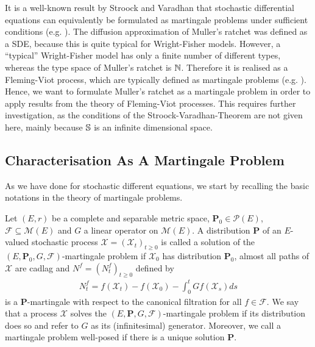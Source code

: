 \noindent
It is a well-known result by Stroock and Varadhan that stochastic differential equations can
equivalently be formulated as martingale problems under sufficient conditions (e.g.
\cite[Theorem 18.7]{kallenberg_foundations_1997}). The diffusion approximation of Muller's ratchet
was defined as a SDE, because this is quite typical for Wright-Fisher models.
However, a ``typical'' Wright-Fisher model has only a finite number of different
types, whereas the type space of Muller's ratchet is $\mathbb{N}$. Therefore it is realised as
a Fleming-Viot process, which are typically defined as martingale problems (e.g.
\cite{ethier_flemingviot_1993}). Hence, we want to formulate Muller's ratchet as
a martingale problem in order to apply results from the theory of Fleming-Viot
processes. This requires further investigation, as the conditions of the
Stroock-Varadhan-Theorem are not given here, mainly because $\mathbb{S}$ is an
infinite dimensional space.


\subsection{Characterisation As A Martingale Problem}

As we have done for stochastic different equations, we start by recalling the basic notations in the
theory of martingale problems.

\begin{Definition}
Let $(E,r)$ be a complete and separable metric space, $\mathbf{P}_0 \in \mathcal{P}(E)$,
$\mathcal{F} \subseteq \mathcal{M}(E)$ and $G$ a linear operator on
$\mathcal{M}(E)$. A distribution $\mathbf{P}$ of an $E$-valued stochastic process $\mathcal{X} =
(\mathcal{X}_t)_{t \geq 0}$ is called a solution of the $(E,
\mathbf{P}_0,G,\mathcal{F})$-martingale problem if $\mathcal{X}_0$ has
distribution $\mathbf{P}_0$, almost all paths of $\mathcal{X}$ are cadlag
and $N^f = (N^f_t)_{t \geq 0}$ defined by
\begin{align} \label{da:eq:N^f}
N^f_t = 
f(\mathcal{X}_t) - f(\mathcal{X}_0) - \int_0^t Gf(\mathcal{X}_s) ds
\end{align}
is a $\mathbf{P}$-martingale with respect to the canonical filtration for all $f \in \mathcal{F}$.
We say that a process $\mathcal{X}$ solves the $(E,
\mathbf{P},G,\mathcal{F})$-martingale problem if its distribution does so and refer to $G$ as its (infinitesimal) generator. Moreover, we call a
martingale problem well-posed if there is a unique solution $\mathbf{P}$. 
\end{Definition}

